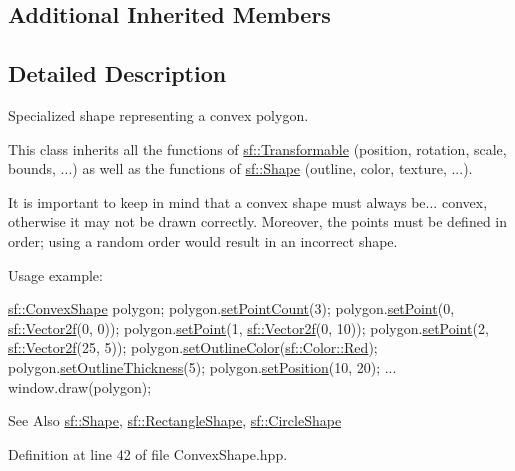 \subsection*{Additional Inherited Members}


\subsection{Detailed Description}
Specialized shape representing a convex polygon. 

This class inherits all the functions of \hyperlink{classsf_1_1_transformable}{sf\-::\-Transformable} (position, rotation, scale, bounds, ...) as well as the functions of \hyperlink{classsf_1_1_shape}{sf\-::\-Shape} (outline, color, texture, ...).

It is important to keep in mind that a convex shape must always be... convex, otherwise it may not be drawn correctly. Moreover, the points must be defined in order; using a random order would result in an incorrect shape.

Usage example\-: 
\begin{DoxyCode}
\hyperlink{classsf_1_1_convex_shape}{sf::ConvexShape} polygon;
polygon.\hyperlink{classsf_1_1_convex_shape_aea7c3f0f08f5cd457fe128a75b7c1e70}{setPointCount}(3);
polygon.\hyperlink{classsf_1_1_convex_shape_ae5c7f87d0e776952e2ec6f0aa12ded31}{setPoint}(0, \hyperlink{classsf_1_1_vector2}{sf::Vector2f}(0, 0));
polygon.\hyperlink{classsf_1_1_convex_shape_ae5c7f87d0e776952e2ec6f0aa12ded31}{setPoint}(1, \hyperlink{classsf_1_1_vector2}{sf::Vector2f}(0, 10));
polygon.\hyperlink{classsf_1_1_convex_shape_ae5c7f87d0e776952e2ec6f0aa12ded31}{setPoint}(2, \hyperlink{classsf_1_1_vector2}{sf::Vector2f}(25, 5));
polygon.\hyperlink{classsf_1_1_shape_a5978f41ee349ac3c52942996dcb184f7}{setOutlineColor}(\hyperlink{classsf_1_1_color_a127dbf55db9c07d0fa8f4bfcbb97594a}{sf::Color::Red});
polygon.\hyperlink{classsf_1_1_shape_a5ad336ad74fc1f567fce3b7e44cf87dc}{setOutlineThickness}(5);
polygon.\hyperlink{classsf_1_1_transformable_a4dbfb1a7c80688b0b4c477d706550208}{setPosition}(10, 20);
...
window.draw(polygon);
\end{DoxyCode}


\begin{DoxySeeAlso}{See Also}
\hyperlink{classsf_1_1_shape}{sf\-::\-Shape}, \hyperlink{classsf_1_1_rectangle_shape}{sf\-::\-Rectangle\-Shape}, \hyperlink{classsf_1_1_circle_shape}{sf\-::\-Circle\-Shape} 
\end{DoxySeeAlso}


Definition at line 42 of file Convex\-Shape.\-hpp.



